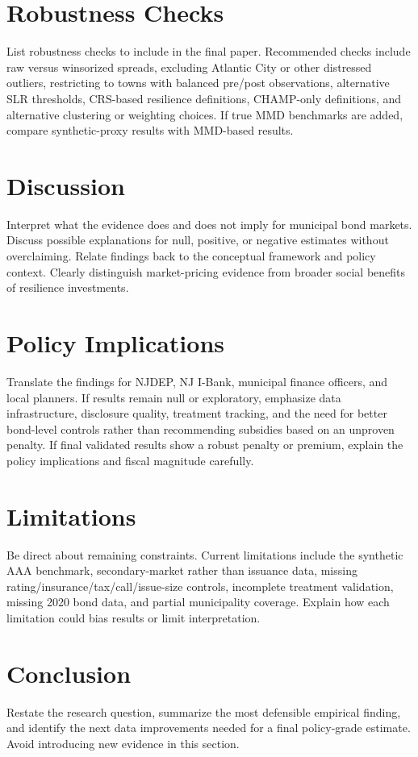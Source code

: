 \documentclass[12pt]{article}
\begin{document}
\section{Robustness Checks}
List robustness checks to include in the final paper.
Recommended checks include raw versus winsorized spreads, excluding Atlantic City or other distressed outliers, restricting to towns with balanced pre/post observations, alternative SLR thresholds, CRS-based resilience definitions, CHAMP-only definitions, and alternative clustering or weighting choices.
If true MMD benchmarks are added, compare synthetic-proxy results with MMD-based results.

\section{Discussion}
Interpret what the evidence does and does not imply for municipal bond markets.
Discuss possible explanations for null, positive, or negative estimates without overclaiming.
Relate findings back to the conceptual framework and policy context.
Clearly distinguish market-pricing evidence from broader social benefits of resilience investments.

\section{Policy Implications}
Translate the findings for NJDEP, NJ I-Bank, municipal finance officers, and local planners.
If results remain null or exploratory, emphasize data infrastructure, disclosure quality, treatment tracking, and the need for better bond-level controls rather than recommending subsidies based on an unproven penalty.
If final validated results show a robust penalty or premium, explain the policy implications and fiscal magnitude carefully.

\section{Limitations}
Be direct about remaining constraints.
Current limitations include the synthetic AAA benchmark, secondary-market rather than issuance data, missing rating/insurance/tax/call/issue-size controls, incomplete treatment validation, missing 2020 bond data, and partial municipality coverage.
Explain how each limitation could bias results or limit interpretation.

\section{Conclusion}
Restate the research question, summarize the most defensible empirical finding, and identify the next data improvements needed for a final policy-grade estimate.
Avoid introducing new evidence in this section.
\end{document}
